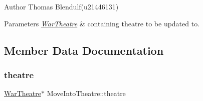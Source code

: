 \begin{DoxyAuthor}{Author}
Thomas Blendulf(u21446131) 
\end{DoxyAuthor}

\begin{DoxyParams}{Parameters}
{\em \mbox{\hyperlink{class_war_theatre}{War\+Theatre}}} & containing theatre to be updated to. \\
\hline
\end{DoxyParams}


\subsection{Member Data Documentation}
\mbox{\label{class_move_into_theatre_a40940d91b168d17242593044cfbf7397}} 
\subsubsection{\texorpdfstring{theatre}{theatre}}
{\footnotesize\ttfamily \mbox{\hyperlink{class_war_theatre}{War\+Theatre}}$\ast$ Move\+Into\+Theatre\+::theatre}

